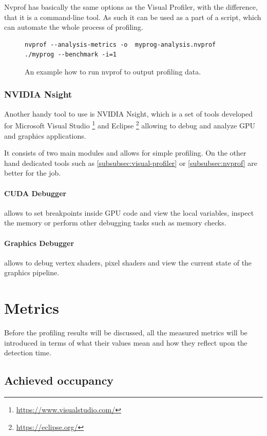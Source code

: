 Nvprof has basically the same options as the Visual Profiler, with the difference, that it is a command-line tool. As such it can be used as a part of a script, which can automate the whole process of profiling.

\begin{figure}
\begin{verbatim}
nvprof --analysis-metrics -o  myprog-analysis.nvprof ./myprog --benchmark -i=1
\end{verbatim}
\caption{An example how to run nvprof to output profiling data.}
\end{figure}

\subsubsection{NVIDIA Nsight}

Another handy tool to use is NVIDIA Nsight, which is a set of tools developed for Microsoft Visual Studio \footnote{\url{https://www.visualstudio.com/}} and Eclipse \footnote{\url{https://eclipse.org/}} allowing to debug and analyze GPU and graphics applications.

It consists of two main modules and allows for simple profiling. On the other hand dedicated tools such as \ref{subsubsec:visual-profiler} or \ref{subsubsec:nvprof} are better for the job.

\paragraph{CUDA Debugger} allows to set breakpoints inside GPU code and view the local variables, inspect the memory or perform other debugging tasks such as memory checks.

\paragraph{Graphics Debugger} allows to debug vertex shaders, pixel shaders and view the current state of the graphics pipeline.

\section{Metrics}\label{sec:metrics}

Before the profiling results will be discussed, all the measured metrics will be introduced in terms of what their values mean and how they reflect upon the detection time.

\subsection{Achieved occupancy}\label{subsec:occupancy}

